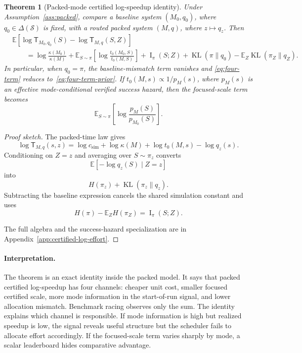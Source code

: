 \documentclass{article}
\newtheorem{theorem}{Theorem}
\DeclareMathOperator{\KL}{KL}
\DeclareMathOperator{\MI}{I}
\newcommand{\cS}{\mathcal{S}}
\newcommand{\E}{\mathbb{E}}
\begin{document}
\begin{theorem}[Packed-mode certified log-speedup identity]
\label{thm:four-term}
Under Assumption~\ref{ass:packed}, compare a baseline system \((M_0,q_0)\), where
\(q_0\in\Delta(\cS)\) is fixed, with a routed packed system \((M,q)\), where
\(z\mapsto q_z\).  Then
\begin{equation}
\label{eq:four-term}
\begin{aligned}
&\E\!\left[
    \log \mathsf T_{M_0,q_0}(S)
    -
    \log \mathsf T_{M,q}(S,Z)
\right]
\\
&\qquad =
\log\frac{\kappa(M_0)}{\kappa(M)}
+
\E_{S\sim\pi}
\left[
    \log\frac{t_0(M_0,S)}{t_0(M,S)}
\right]
+
\MI_\pi(S;Z)
+
\KL(\pi\|q_0)
-
\E_Z\KL(\pi_Z\|q_Z).
\end{aligned}
\end{equation}
In particular, when \(q_0=\pi\), the baseline-mismatch term vanishes and
\eqref{eq:four-term} reduces to~\eqref{eq:four-term-prior}.
If \(t_0(M,s)\propto 1/p_M(s)\), where \(p_M(s)\) is an effective mode-conditional
verified success hazard, then the focused-scale term becomes
\[
    \E_{S\sim\pi}
    \left[
        \log\frac{p_M(S)}{p_{M_0}(S)}
    \right].
\]
\end{theorem}

\begin{proof}[Proof sketch]
The packed-time law gives
\[
    \log \mathsf T_{M,q}(s,z)
    =
    \log c_{\mathrm{sim}}
    +
    \log\kappa(M)
    +
    \log t_0(M,s)
    -
    \log q_z(s).
\]
Conditioning on \(Z=z\) and averaging over \(S\sim\pi_z\) converts
\[
    \E[-\log q_z(S)\mid Z=z]
\]
into
\[
    H(\pi_z)+\KL(\pi_z\|q_z).
\]
Subtracting the baseline expression cancels the shared simulation constant and uses
\[
    H(\pi)-\E_ZH(\pi_Z)=\MI_\pi(S;Z).
\]

The full algebra and the success-hazard specialization are in
Appendix~\ref{app:certified-log-effort}.
\end{proof}

\paragraph{Interpretation.}
The theorem is an exact identity inside the packed model.  It says that packed certified
log-speedup has four channels: cheaper unit cost, smaller focused certified scale, more
mode information in the start-of-run signal, and lower allocation mismatch.  Benchmark
racing observes only the sum.  The identity explains which channel is responsible.  If mode
information is high but realized speedup is low, the signal reveals useful structure but the
scheduler fails to allocate effort accordingly.  If the focused-scale term varies sharply by
mode, a scalar leaderboard hides comparative advantage.
\end{document}
